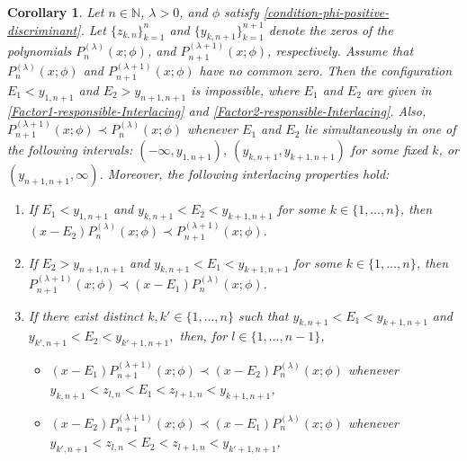 \documentclass[final,3p,times,12pt]{elsarticle}
\newtheorem{corollary}{Corollary}[section]
\numberwithin{equation}{section}  %
\begin{document}
	
	\begin{corollary}\label{MP-Interlacing-two-points}
		Let $n \in \mathbb{N}$, $\lambda > 0$, and $\phi$ satisfy \eqref{condition-phi-positive-discriminant}.
		Let $\{z_{k,n}\}_{k=1}^{n}$ and $\{y_{k,n+1}\}_{k=1}^{n+1}$ denote the zeros of the polynomials $P_n^{(\lambda)}(x;\phi)$, and $P_{n+1}^{(\lambda+1)}(x;\phi)$,  respectively. Assume that $P_{n}^{(\lambda)}(x;\phi)$ and $P_{n+1}^{(\lambda+1)}(x;\phi)$ have no common zero. Then the configuration $E_1<y_{1,n+1}$ and $E_2>y_{n+1,n+1}$ is impossible, where  $E_1$ and $E_2$ are given in \eqref{Factor1-responsible-Interlacing} and \eqref{Factor2-responsible-Interlacing}. Also,  $P_{n+1}^{(\lambda+1)}(x;\phi)\prec P_{n}^{(\lambda)}(x;\phi)$  whenever $E_1$ and $E_2$ lie simultaneously in one of the following intervals: $(-\infty,y_{1,n+1})$, $(y_{k,n+1},y_{k+1,n+1})$ for some fixed $k$, or $(y_{n+1,n+1},\infty)$. 	Moreover, the following interlacing properties hold:
		
		\begin{enumerate}[label=\alph*)]
			\item 
			If $E_1<y_{1,n+1}$ and $y_{k,n+1}<E_2<y_{k+1,n+1}$ for some $k\in\{1,\dots,n\}$, then  $(x-E_2)P_{n}^{(\lambda)}(x;\phi)\prec P_{n+1}^{(\lambda+1)}(x;\phi)$.
			
			\item 
			If $E_2>y_{n+1,n+1}$ and $y_{k,n+1}<E_1<y_{k+1,n+1}$ for some $k\in\{1,\dots,n\}$, then  $P_{n+1}^{(\lambda+1)}(x;\phi) \prec (x-E_1)P_{n}^{(\lambda)}(x;\phi)$.
			
			\item 
			If there exist distinct $k,k'\in\{1,\dots,n\}$ such that $y_{k,n+1} < E_1 < y_{k+1,n+1}$ and
			$y_{k',n+1} < E_2 < y_{k'+1,n+1},
			$  then, for $l\in\{1,\dots,n-1\}$, \begin{itemize}\item[(i)]   $(x-E_1)P_{n+1}^{(\lambda+1)}(x;\phi)\prec (x-E_2)P_{n}^{(\lambda)}(x;\phi)$ whenever $
				y_{k,n+1} < z_{l,n} < E_1 < z_{l+1,n} < y_{k+1,n+1}
				$,
				\item[(ii)] $(x-E_2)P_{n+1}^{(\lambda+1)}(x;\phi)\prec (x-E_1)P_{n}^{(\lambda)}(x;\phi)$  whenever 
				$y_{k',n+1} < z_{l,n} < E_2 < z_{l+1,n} < y_{k'+1,n+1}$,  \end{itemize}
		\end{enumerate}
	\end{corollary}
	
\end{document}
